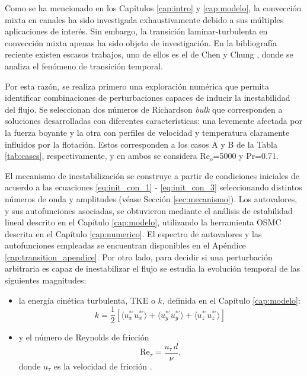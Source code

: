 Como se ha mencionado en los Capítulos \ref{cap:intro} y \ref{cap:modelo}, la convección mixta en canales ha sido investigada exhaustivamente debido a sus múltiples aplicaciones de interés. Sin embargo, la transición laminar-turbulenta en convección mixta apenas ha sido objeto de investigación. En la bibliografía reciente existen escasos trabajos, uno de ellos es el de Chen y Chung \cite{chen2003direct}, donde se analiza el fenómeno de transición temporal.

Por esta razón, se realiza primero una exploración numérica que permita identificar combinaciones de perturbaciones capaces de inducir la inestabilidad del flujo. Se seleccionan dos números de Richardson \textit{bulk} que corresponden a soluciones desarrolladas con diferentes características: una levemente afectada por la fuerza boyante y la otra con perfiles de velocidad y temperatura claramente influidos por la flotación. Estos corresponden a los casos A y B de la Tabla \ref{tab:cases}, respectivamente, y en ambos se considera Re$_o$=5000 y Pr=0.71.

El mecanismo de inestabilización se construye a partir de condiciones iniciales de acuerdo a las ecuaciones \ref{eq:init_con_1} - \ref{eq:init_con_3} seleccionando distintos números de onda y amplitudes (véase Sección \ref{sec:mecanismo}). Los autovalores, y sus autofunciones asociadas, se obtuvieron mediante el análisis de estabilidad lineal descrito en el Capítulo \ref{cap:modelo}, utilizando la herramienta OSMC descrita en el Capítulo \ref{cap:numerico}. El espectro de autovalores y las autofunciones empleadas se encuentran disponibles en el Apéndice \ref{cap:transition_apendice}. Por otro lado, para decidir si una perturbación arbitraria es capaz de inestabilizar el flujo se estudia la evolución temporal de las siguientes magnitudes:

\begin{itemize}
  \item la energía cinética turbulenta, TKE o $k$, definida en el Capítulo \ref{cap:modelo}: 
  	\begin{equation*}
  		k = \frac{1}{2} \left[ \langle u^{* \prime}_x u^{* \prime}_x \rangle + \langle u^{* \prime}_y u^{* \prime}_y \rangle + \langle u^{* \prime}_z u^{* \prime}_z \rangle \right] \ 
  	\end{equation*}
  	
  

  \item y el número de Reynolds de fricción
        \[
          \text{Re}_{\tau} = \frac{u_{\tau}\,d}{\nu},
        \]
        donde \(u_{\tau}\) es la velocidad de fricción \cite{pope2001turbulent}.
\end{itemize}

